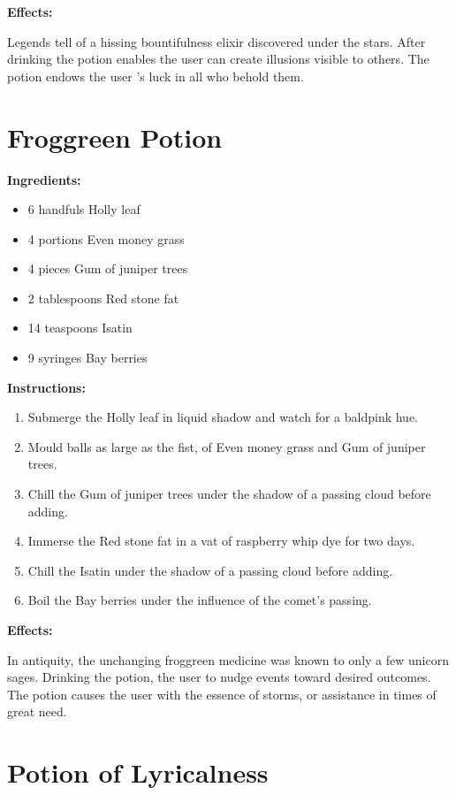 \documentclass{article}
\begin{document}
\textbf{Effects:}

Legends tell of a hissing bountifulness elixir discovered under the stars. After drinking the potion enables the user can create illusions visible to others. The potion endows the user 's luck in all who behold them.

\newpage
\section*{Froggreen Potion}

\textbf{Ingredients:}

\begin{itemize}
  \item 6 handfuls Holly leaf
  \item 4 portions Even money grass
  \item 4 pieces Gum of juniper trees
  \item 2 tablespoons Red stone fat
  \item 14 teaspoons Isatin
  \item 9 syringes Bay berries
\end{itemize}

\textbf{Instructions:}

\begin{enumerate}
  \item Submerge the Holly leaf in liquid shadow and watch for a baldpink hue.
  \item Mould balls as large as the fist, of Even money grass and Gum of juniper trees.
  \item Chill the Gum of juniper trees under the shadow of a passing cloud before adding.
  \item Immerse the Red stone fat in a vat of raspberry whip dye for two days.
  \item Chill the Isatin under the shadow of a passing cloud before adding.
  \item Boil the Bay berries under the influence of the comet’s passing.
\end{enumerate}

\textbf{Effects:}

In antiquity, the unchanging froggreen medicine was known to only a few unicorn sages. Drinking the potion, the user to nudge events toward desired outcomes. The potion causes the user with the essence of storms, or assistance in times of great need.

\newpage
\section*{Potion of Lyricalness}
\end{document}
